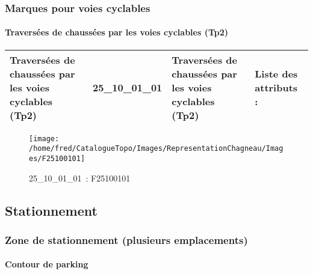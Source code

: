 \documentclass[12pt,titlepage,oneside]{book}
\begin{document}
\subsubsection{\large Marques pour voies cyclables}
\paragraph{Traversées de chaussées par les voies cyclables (Tp2)}
\noindent
\vspace{\baselineskip}

\renewcommand{\arraystretch}{1.2}
\begin{supertabular}{|p{10cm}|c|p{13cm}|p{12cm}|}
 Traversées de chaussées par les voies cyclables (Tp2) & 25\_10\_01\_01 & Traversées de chaussées par les voies cyclables (Tp2) & Liste des attributs :
\begin{enumerate}
\end{enumerate}
\\
\hline
\end{supertabular}
\begin{figure}[h!]
  \hfill         %
  \begin{minipage}[t]{3cm}
    \begin{center}
      \texttt{[image: /home/fred/CatalogueTopo/Images/RepresentationChagneau/Images/F25100101]}
      \caption[~25\_10\_01\_01]{\small{25\_10\_01\_01~:} \tiny{F25100101}}\label{F25100101}
    \end{center}
  \end{minipage}
\end{figure}
\subsection{Stationnement}
\subsubsection{\large Zone de stationnement (plusieurs emplacements)}
\paragraph{Contour de parking}
\noindent
\vspace{\baselineskip}
\end{document}
